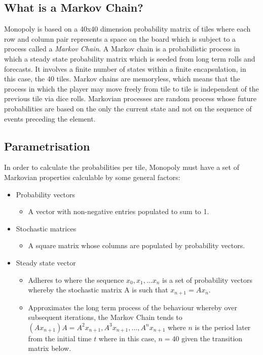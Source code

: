 \documentclass[12pt]{article}
\begin{document}
\subsection{What is a Markov Chain?}
Monopoly is based on a 40x40 dimension probability matrix of tiles where each row and column pair represents a space on the board which is subject to a process called a \emph{Markov Chain}. A Markov chain is a probabilistic process in which a steady state probability matrix which is seeded from long term rolls and forecasts. It involves a finite number of states within a finite encapsulation, in this case, the 40 tiles. Markov chains are memoryless, which means that the process in which the player may move freely from tile to tile is independent of the previous tile via dice rolls. Markovian processes are random process whose future probabilities are based on the only the current state and not on the sequence of events preceding the element.

\subsection{Parametrisation}
In order to calculate the probabilities per tile, Monopoly must have a set of Markovian properties calculable by some general factors:
\begin{itemize}
\item Probability vectors
\begin{itemize}
\item A vector with non-negative entries populated to sum to 1.
\end{itemize}
\item Stochastic matrices
\begin{itemize}
\item A square matrix whose columns are populated by probability vectors.
\end{itemize}
\item Steady state vector
\begin{itemize}
\item Adheres to where the sequence $x_0,x_1,...x_n$ is a set of probability vectors whereby the stochastic matrix A is such that $x_{n+1}=Ax_{n}$.
\item Approximates the long term process of the behaviour whereby over subsequent iterations, the Markov Chain tends to $(Ax_{n+1})A=A^2x_{n+1},A^3x_{n+1},...,A^nx_{n+1}$ where $n$ is the period later from the initial time $t$ where in this case, $n=40$ given the transition matrix below.
\end{itemize}
\end{itemize}
\end{document}
